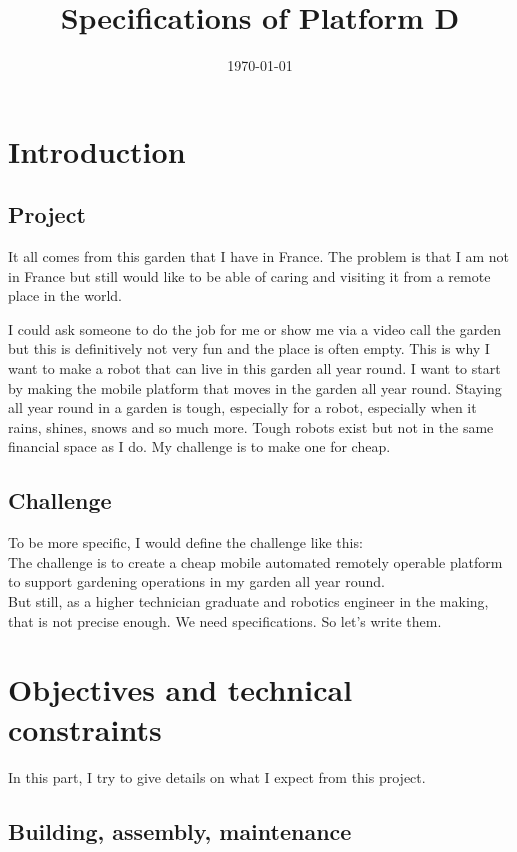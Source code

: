 \documentclass[oneside, DIV=11]{scrreprt}
\title{Specifications of Platform D}
\author{}
\date{\today}
\begin{document}


\tableofcontents
\newpage

\chapter{Introduction}

\section{Project}

It all comes from this garden that I have in France. The problem is that I am not in France but still would like to be able of caring and visiting it 
from a remote place in the world.

I could ask someone to do the job for me or show me via a video call the garden but this is definitively not very fun and the place is often empty. This is why I want to make a robot that can live in this garden all year round. I want to start by making the mobile platform that moves in the garden all year round. Staying all year round in a garden is tough, especially for a robot, especially when it rains, shines, snows and so much more. Tough robots exist but not in the same financial space as I do. My challenge is to make one for cheap. 


\section{Challenge}

To be more specific, I would define the challenge like this:\\[2cm]

The challenge is to create a cheap mobile automated remotely operable platform to support gardening operations in my garden all year round.\\[2cm]

But still, as a higher technician graduate and robotics engineer in the making, that is not precise enough. We need specifications. So let's write them.

\chapter{Objectives and technical constraints}

In this part, I try to give details on what I expect from this project.

\section{Building, assembly, maintenance}
\end{document}
